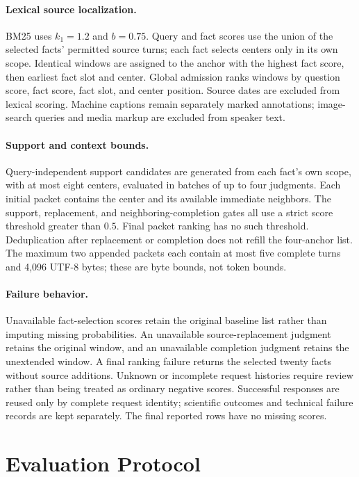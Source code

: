 \documentclass[11pt]{article}
\begin{document}
\paragraph{Lexical source localization.}
BM25 uses $k_1=1.2$ and $b=0.75$. Query and fact scores use the union of the selected facts' permitted source turns; each fact selects centers only in its own scope. Identical windows are assigned to the anchor with the highest fact score, then earliest fact slot and center. Global admission ranks windows by question score, fact score, fact slot, and center position. Source dates are excluded from lexical scoring. Machine captions remain separately marked annotations; image-search queries and media markup are excluded from speaker text.

\paragraph{Support and context bounds.}
Query-independent support candidates are generated from each fact's own scope, with at most eight centers, evaluated in batches of up to four judgments. Each initial packet contains the center and its available immediate neighbors. The support, replacement, and neighboring-completion gates all use a strict score threshold greater than $0.5$. Final packet ranking has no such threshold. Deduplication after replacement or completion does not refill the four-anchor list. The maximum two appended packets each contain at most five complete turns and 4,096 UTF-8 bytes; these are byte bounds, not token bounds.

\paragraph{Failure behavior.}
Unavailable fact-selection scores retain the original baseline list rather than imputing missing probabilities. An unavailable source-replacement judgment retains the original window, and an unavailable completion judgment retains the unextended window. A final ranking failure returns the selected twenty facts without source additions. Unknown or incomplete request histories require review rather than being treated as ordinary negative scores. Successful responses are reused only by complete request identity; scientific outcomes and technical failure records are kept separately. The final reported rows have no missing scores.

\section{Evaluation Protocol}
\label{app:evaluation}
\end{document}
